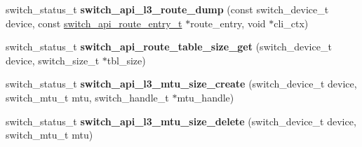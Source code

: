 \begin{DoxyCompactItemize}
\item 
\hypertarget{group__L3_gafd31b4919c10fb9b149af2767e98fadc}{switch\+\_\+status\+\_\+t {\bfseries switch\+\_\+api\+\_\+l3\+\_\+route\+\_\+dump} (const switch\+\_\+device\+\_\+t device, const \hyperlink{group__L3_ga969f26e2a3436107bc9b6e9f749c79b8}{switch\+\_\+api\+\_\+route\+\_\+entry\+\_\+t} $\ast$route\+\_\+entry, void $\ast$cli\+\_\+ctx)}\label{group__L3_gafd31b4919c10fb9b149af2767e98fadc}

\item 
\hypertarget{group__L3_ga1b4e3ff5e8e018a73a46b7552be1d4b8}{switch\+\_\+status\+\_\+t {\bfseries switch\+\_\+api\+\_\+route\+\_\+table\+\_\+size\+\_\+get} (switch\+\_\+device\+\_\+t device, switch\+\_\+size\+\_\+t $\ast$tbl\+\_\+size)}\label{group__L3_ga1b4e3ff5e8e018a73a46b7552be1d4b8}

\item 
\hypertarget{group__L3_gab05e3a149cd1abdf76e2f55a4190afbc}{switch\+\_\+status\+\_\+t {\bfseries switch\+\_\+api\+\_\+l3\+\_\+mtu\+\_\+size\+\_\+create} (switch\+\_\+device\+\_\+t device, switch\+\_\+mtu\+\_\+t mtu, switch\+\_\+handle\+\_\+t $\ast$mtu\+\_\+handle)}\label{group__L3_gab05e3a149cd1abdf76e2f55a4190afbc}

\item 
\hypertarget{group__L3_ga80e2ad82b10405ede999eecb38373528}{switch\+\_\+status\+\_\+t {\bfseries switch\+\_\+api\+\_\+l3\+\_\+mtu\+\_\+size\+\_\+delete} (switch\+\_\+device\+\_\+t device, switch\+\_\+mtu\+\_\+t mtu)}\label{group__L3_ga80e2ad82b10405ede999eecb38373528}


\end{DoxyCompactItemize}
